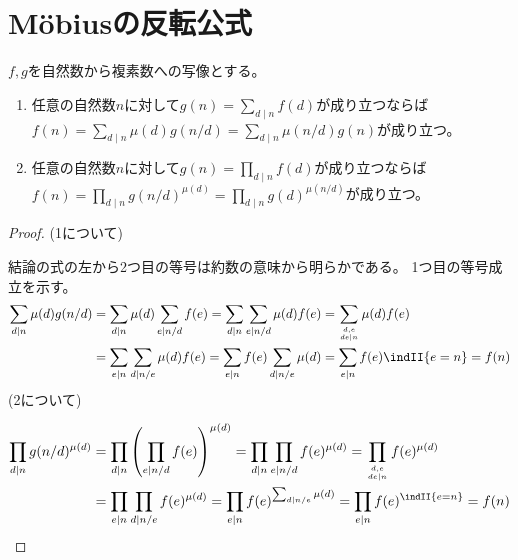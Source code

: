     \section{M\"obiusの反転公式}
        \begin{shadebox}
            $f,g$を自然数から複素数への写像とする。
            \begin{enumerate}
                \item 任意の自然数$n$に対して$g(n) = \sum_{d \mid n}f(d)$が成り立つならば$f(n) = \sum_{d \mid n} \mu(d)g(n/d) = \sum_{d \mid n} \mu(n/d)g(n)$が成り立つ。
                \item 任意の自然数$n$に対して$g(n) = \prod_{d \mid n}f(d)$が成り立つならば$f(n) = \prod_{d \mid n} g(n/d)^{\mu(d)} = \prod_{d \mid n} g(d)^{\mu(n/d)}$が成り立つ。
            \end{enumerate}
        \end{shadebox}
        \begin{proof}
            \quad\par
            (1について)
            \par
            結論の式の左から2つ目の等号は約数の意味から明らかである。
            1つ目の等号成立を示す。
            \begin{align*}
                \sum_{d \mid n} \mu(d)g(n/d) &= \sum_{d \mid n} \mu(d)\sum_{e \mid n/d} f(e) = \sum_{d \mid n} \sum_{e \mid n/d} \mu(d)f(e) = \sum_{\genfrac{}{}{0pt}{}{d,e}{de \mid n}} \mu(d)f(e) \\
                &= \sum_{e \mid n} \sum_{d \mid n/e} \mu(d)f(e) = \sum_{e \mid n} f(e) \sum_{d \mid n/e} \mu(d) = \sum_{e \mid n} f(e) \indII{e=n} = f(n)
            \end{align*}
            \newline
            \newline
            (2について)
            \par
            \begin{align*}
                \prod_{d \mid n} g(n/d)^{\mu(d)} &= \prod_{d \mid n} \left(\prod_{e \mid n/d} f(e)\right)^{\mu(d)} = \prod_{d \mid n} \prod_{e \mid n/d} f(e)^{\mu(d)} = \prod_{\genfrac{}{}{0pt}{}{d,e}{de \mid n}} f(e)^{\mu(d)} \\
                &= \prod_{e \mid n} \prod_{d \mid n/e} f(e)^{\mu(d)} = \prod_{e \mid n} f(e)^{\sum_{d \mid n/e} \mu(d)} = \prod_{e \mid n} f(e)^{\indII{e=n}} = f(n)
            \end{align*}
        \end{proof}
